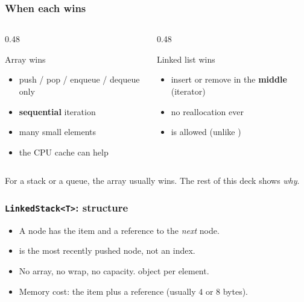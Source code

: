 \documentclass[aspectratio=169,10pt,compress]{beamer}
\begin{document}
\begin{frame}[t,fragile] \frametitle{When each wins}
  \begin{columns}[T]
    \begin{column}{0.48\textwidth}
      \begin{block}{Array wins}
        \small
        \begin{itemize}
          \item push / pop / enqueue / dequeue only
          \item \textbf{sequential} iteration
          \item many small elements
          \item the CPU cache can help
        \end{itemize}
      \end{block}
    \end{column}
    \begin{column}{0.48\textwidth}
      \begin{block}{Linked list wins}
        \small
        \begin{itemize}
          \item insert or remove in the \textbf{middle} (iterator)
          \item no reallocation ever
          \item {} is allowed (unlike )
        \end{itemize}
      \end{block}
    \end{column}
  \end{columns}
  \vspace{0.6em}
  \small
  For a stack or a queue, the array usually wins.
  The rest of this deck shows \emph{why}.
\end{frame}





\begin{frame}[t,fragile] \frametitle{\texttt{LinkedStack<T>}: structure}
  \begin{itemize}\small
    \item A node has the item and a reference to the \emph{next} node.
    \item {} is the most recently pushed node, not an index.
    \item No array, no wrap, no capacity.  object per element.
    \item Memory cost: the item plus a reference (usually $4$ or $8$ bytes).
  \end{itemize}
\end{frame}
\end{document}
